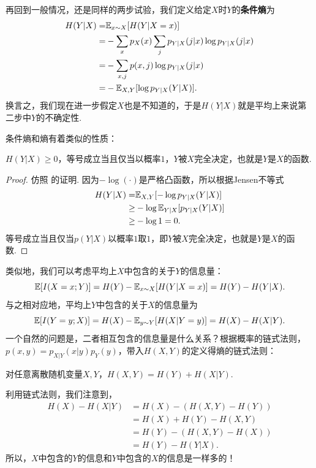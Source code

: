 再回到一般情况，还是同样的两步试验，我们定义给定$X$时$Y$的\textbf{条件熵}为
\begin{align*}
    H(Y| X)=&\mathbb{E}_{x\sim X}[H(Y|X=x)]\\
    =&-\sum_x p_{X}(x)\sum_{j}p_{Y|X}(j|x)\log p_{Y|X}(j|x)\\
    =&-\sum_{x,j}p(x,j)\log p_{Y|X}(j|x)\\
    =&-\mathbb{E}_{X,Y}[\log p_{Y| X}(Y|X)].
\end{align*}
换言之，我们现在进一步假定$X$也是不知道的，于是$H(Y|X)$就是平均上来说第二步中$Y$的不确定性. 

条件熵和熵有着类似的性质：
\begin{proposition}\label{proposition:conditional-entropy-nonnegative}
    $H(Y|X)\geq 0$，等号成立当且仅当以概率$1$，$Y$被$X$完全决定，也就是$Y$是$X$的函数.
\end{proposition}
\begin{proof}
    仿照 的证明. 因为$-\log(\cdot)$是严格凸函数，所以根据Jensen不等式
    \begin{align*}
        H(Y|X)=&\mathbb{E}_{X,Y}[-\log p_{Y| X}(Y|X)]\\
        \geq&-\log\mathbb{E}_{Y|X}[p_{Y|X}(Y|X)]\\
        \geq& -\log 1=0.
    \end{align*}
    等号成立当且仅当$p(Y|X)$以概率$1$取$1$，即$Y$被$X$完全决定，也就是$Y$是$X$的函数.
\end{proof}
类似地，我们可以考虑平均上$X$中包含的关于$Y$的信息量：
\[\mathbb{E}[I(X=x;Y)]=H(Y)-\mathbb{E}_{x\sim X}[H(Y|X=x)]=H(Y)-H(Y|X).\]
与之相对应地，平均上$Y$中包含的关于$X$的信息量为
\[\mathbb{E}[I(Y=y;X)] = H(X) - \mathbb{E}_{y\sim Y}[H(X|Y=y)] = H(X) - H(X|Y).\]
一个自然的问题是，二者相互包含的信息量是什么关系？根据概率的链式法则，$p(x,y)=p_{X|Y}(x|y)p_Y(y)$，带入$H(X,Y)$的定义得熵的链式法则：

\begin{proposition}\label{proposition:entropy-chain-rule}
    对任意离散随机变量$X,Y$，$H(X,Y)=H(Y)+H(X|Y)$.    
\end{proposition}

利用链式法则，我们注意到，
\begin{align*}
    H(X)-H(X|Y)&=H(X)-(H(X,Y)-H(Y))\\
               &=H(X)+H(Y)-H(X,Y)\\
               &=H(Y)-(H(X,Y)-H(X))\\
               &=H(Y)-H(Y|X).
\end{align*}
所以，$X$中包含的$Y$的信息和$Y$中包含的$X$的信息是一样多的！

